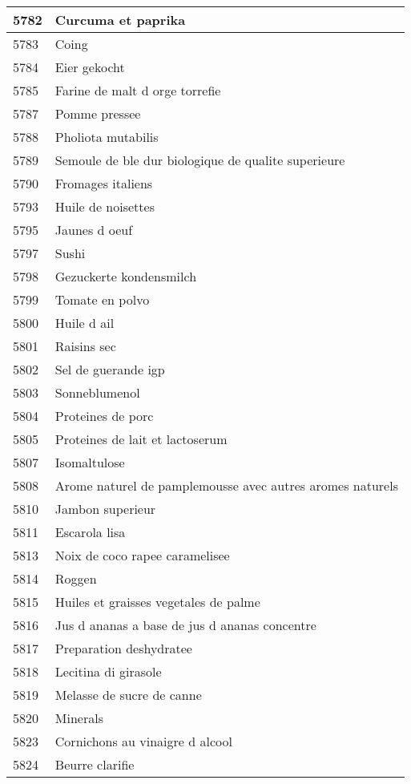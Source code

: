 \begin{longtable}{|l|l|}
5782 & Curcuma et paprika \\ \hline 
5783 & Coing \\ \hline 
5784 & Eier gekocht \\ \hline 
5785 & Farine de malt d orge torrefie \\ \hline 
5787 & Pomme pressee \\ \hline 
5788 & Pholiota mutabilis \\ \hline 
5789 & Semoule de ble dur biologique de qualite superieure \\ \hline 
5790 & Fromages italiens \\ \hline 
5793 & Huile de noisettes \\ \hline 
5795 & Jaunes d oeuf \\ \hline 
5797 & Sushi \\ \hline 
5798 & Gezuckerte kondensmilch \\ \hline 
5799 & Tomate en polvo \\ \hline 
5800 & Huile d ail \\ \hline 
5801 & Raisins sec \\ \hline 
5802 & Sel de guerande igp \\ \hline 
5803 & Sonneblumenol \\ \hline 
5804 & Proteines de porc \\ \hline 
5805 & Proteines de lait et lactoserum \\ \hline 
5807 & Isomaltulose \\ \hline 
5808 & Arome naturel de pamplemousse avec autres aromes naturels \\ \hline 
5810 & Jambon superieur \\ \hline 
5811 & Escarola lisa \\ \hline 
5813 & Noix de coco rapee caramelisee \\ \hline 
5814 & Roggen \\ \hline 
5815 & Huiles et graisses vegetales de palme \\ \hline 
5816 & Jus d ananas a base de jus d ananas concentre \\ \hline 
5817 & Preparation deshydratee \\ \hline 
5818 & Lecitina di girasole \\ \hline 
5819 & Melasse de sucre de canne \\ \hline 
5820 & Minerals \\ \hline 
5823 & Cornichons au vinaigre d alcool \\ \hline 
5824 & Beurre clarifie \\ \hline 

\end{longtable}
